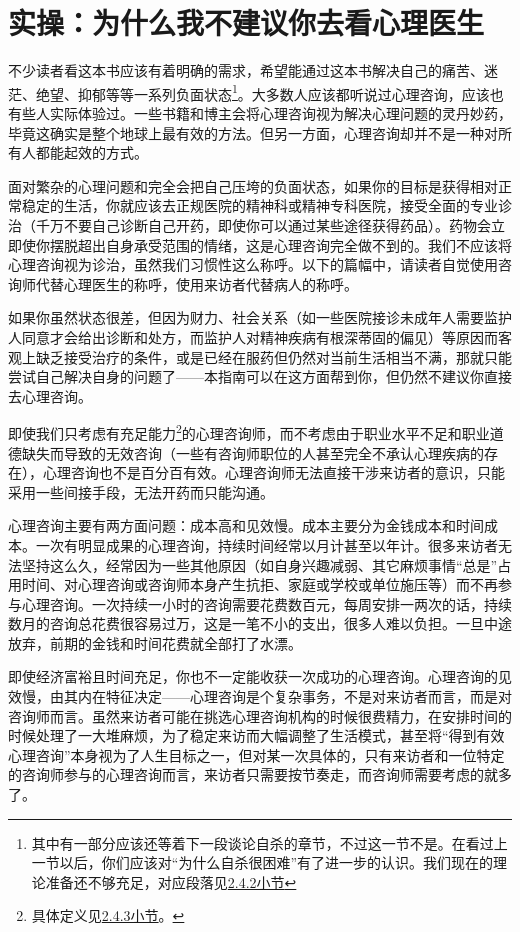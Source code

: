 \section{实操：为什么我不建议你去看心理医生\label{sec:实操1}}
不少读者看这本书应该有着明确的需求，希望能通过这本书解决自己的痛苦、迷茫、绝望、抑郁等等一系列负面状态\footnote{其中有一部分应该还等着下一段谈论自杀的章节，不过这一节不是。在看过上一节以后，你们应该对“为什么自杀很困难”有了进一步的认识。我们现在的理论准备还不够充足，对应段落见\hyperref[sec:再谈死亡]{2.4.2小节}}。大多数人应该都听说过心理咨询，应该也有些人实际体验过。一些书籍和博主会将心理咨询视为解决心理问题的灵丹妙药，毕竟这确实是整个地球上最有效的方法。但另一方面，心理咨询却并不是一种对所有人都能起效的方式。

面对繁杂的心理问题和完全会把自己压垮的负面状态，如果你的目标是获得相对正常稳定的生活，你就应该去正规医院的精神科或精神专科医院，接受全面的专业诊治（千万不要自己诊断自己开药，即使你可以通过某些途径获得药品）。药物会立即使你摆脱超出自身承受范围的情绪，这是心理咨询完全做不到的。我们不应该将心理咨询视为诊治，虽然我们习惯性这么称呼。以下的篇幅中，请读者自觉使用咨询师代替心理医生的称呼，使用来访者代替病人的称呼。

如果你虽然状态很差，但因为财力、社会关系（如一些医院接诊未成年人需要监护人同意才会给出诊断和处方，而监护人对精神疾病有根深蒂固的偏见）等原因而客观上缺乏接受治疗的条件，或是已经在服药但仍然对当前生活相当不满，那就只能尝试自己解决自身的问题了——本指南可以在这方面帮到你，但仍然不建议你直接去心理咨询。

即使我们只考虑有充足能力\footnote{具体定义见\hyperref[def:心理咨询能力]{2.4.3小节}。}的心理咨询师，而不考虑由于职业水平不足和职业道德缺失而导致的无效咨询（一些有咨询师职位的人甚至完全不承认心理疾病的存在），心理咨询也不是百分百有效。心理咨询师无法直接干涉来访者的意识，只能采用一些间接手段，无法开药而只能沟通。

心理咨询主要有两方面问题：成本高和见效慢。成本主要分为金钱成本和时间成本。一次有明显成果的心理咨询，持续时间经常以月计甚至以年计。很多来访者无法坚持这么久，经常因为一些其他原因（如自身兴趣减弱、其它麻烦事情“总是”占用时间、对心理咨询或咨询师本身产生抗拒、家庭或学校或单位施压等）而不再参与心理咨询。一次持续一小时的咨询需要花费数百元，每周安排一两次的话，持续数月的咨询总花费很容易过万，这是一笔不小的支出，很多人难以负担。一旦中途放弃，前期的金钱和时间花费就全部打了水漂。

即使经济富裕且时间充足，你也不一定能收获一次成功的心理咨询。心理咨询的见效慢，由其内在特征决定——心理咨询是个复杂事务，不是对来访者而言，而是对咨询师而言。虽然来访者可能在挑选心理咨询机构的时候很费精力，在安排时间的时候处理了一大堆麻烦，为了稳定来访而大幅调整了生活模式，甚至将“得到有效心理咨询”本身视为了人生目标之一，但对某一次具体的，只有来访者和一位特定的咨询师参与的心理咨询而言，来访者只需要按节奏走，而咨询师需要考虑的就多了。


